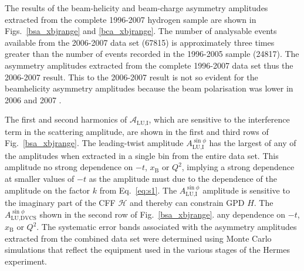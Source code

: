 The results of the beam-helicity and beam-charge asymmetry amplitudes extracted from the complete 1996-2007 hydrogen sample are shown in Figs.~\ref{bsa_xbjrange} and \ref{bca_xbjrange}. The number of analysable events available from the 2006-2007 data set (67815) is approximately three times greater than the number of events recorded in the 1996-2005 sample (24817). The  asymmetry amplitudes extracted from the complete 1996-2007 data set thus  the 2006-2007 result. This  to the 2006-2007 result is not so evident for the beam\red{-}helicity asymmetry amplitudes because the beam polarisation was lower in 2006 and 2007 .

The first and second harmonics of $\mathcal{A}_{\textrm{LU,I}}$, which are
sensitive to the interference term in the scattering amplitude, are shown in the first and third rows of Fig.~\ref{bsa_xbjrange}. The leading-twist amplitude $A_{\textrm{LU,I}}^{\sin\phi}$ has the largest  of any of the amplitudes when extracted in a single bin from the entire data set. This amplitude  no strong dependence on $-t$, $x_{\textrm{B}}$ or $Q^{2}$, implying a strong dependence at smaller values of $-t$ as the amplitude must  due to the dependence of the amplitude on the factor $k$ from Eq.~\ref{eq:s1}. The $A_{\textrm{LU,I}}^{\sin\phi}$ amplitude is sensitive to the imaginary part of the CFF $\mathcal{H}$ and thereby can constrain GPD $\textit{H}$. The $A_{\textrm{LU,DVCS}}^{\sin\phi}$  shown in the second row of Fig.~\ref{bsa_xbjrange}.  any dependence on $-t$, $x_{\textrm{B}}$ or $Q^{2}$. The systematic error bands associated with the asymmetry amplitudes extracted from the combined data set were determined using Monte Carlo simulations that reflect the equipment used in the various stages of the H{\sc ermes} experiment. 

